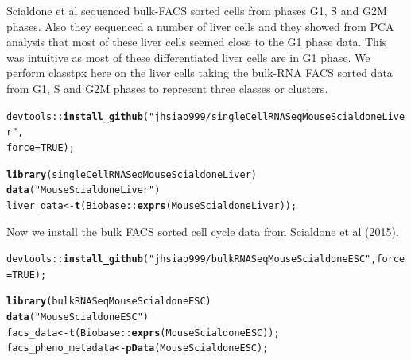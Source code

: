 \documentclass[12pt]{article}\usepackage[]{graphicx}\usepackage[usenames,dvipsnames]{color}
\makeatletter
\newcommand{\hlnum}[1]{\textcolor[rgb]{0.686,0.059,0.569}{#1}}%
\newcommand{\hlstr}[1]{\textcolor[rgb]{0.192,0.494,0.8}{#1}}%
\newcommand{\hlopt}[1]{\textcolor[rgb]{0,0,0}{#1}}%
\newcommand{\hlstd}[1]{\textcolor[rgb]{0.345,0.345,0.345}{#1}}%
\newcommand{\hlkwb}[1]{\textcolor[rgb]{0.69,0.353,0.396}{#1}}%
\newcommand{\hlkwc}[1]{\textcolor[rgb]{0.333,0.667,0.333}{#1}}%
\newcommand{\hlkwd}[1]{\textcolor[rgb]{0.737,0.353,0.396}{\textbf{#1}}}%
\newenvironment{kframe}{%
 \def\at@end@of@kframe{}%
 \ifinner\ifhmode%
  \def\at@end@of@kframe{\end{minipage}}%
  \begin{minipage}{\columnwidth}%
 \fi\fi%
 \def\FrameCommand##1{\hskip\@totalleftmargin \hskip-\fboxsep
 \colorbox{shadecolor}{##1}\hskip-\fboxsep
     \hskip-\linewidth \hskip-\@totalleftmargin \hskip\columnwidth}%
 \MakeFramed {\advance\hsize-\width
   \@totalleftmargin\z@ \linewidth\hsize
   \@setminipage}}%
 {\par\unskip\endMakeFramed%
 \at@end@of@kframe}
\newenvironment{knitrout}{}{} %
\makeatother
\begin{document}
Scialdone et al sequenced bulk-FACS sorted cells from phases G1, S and G2M phases. Also they sequenced a number of liver cells and they showed from PCA analysis that most of these liver cells seemed close to the G1 phase data. This was intuitive as most of these differentiated liver cells are in G1 phase. We perform classtpx here on the liver cells taking the bulk-RNA FACS sorted data from G1, S and G2M phases to represent three classes or clusters.

\begin{knitrout}
\color{fgcolor}\begin{kframe}
\begin{alltt}
\hlstd{devtools}\hlopt{::}\hlkwd{install_github}\hlstd{(}\hlstr{"jhsiao999/singleCellRNASeqMouseScialdoneLiver"}\hlstd{,}
                         \hlkwc{force}\hlstd{=}\hlnum{TRUE}\hlstd{);}
\end{alltt}
\end{kframe}
\end{knitrout}

\begin{knitrout}
\color{fgcolor}\begin{kframe}
\begin{alltt}
\hlkwd{library}\hlstd{(singleCellRNASeqMouseScialdoneLiver)}
\hlkwd{data}\hlstd{(}\hlstr{"MouseScialdoneLiver"}\hlstd{)}
\hlstd{liver_data} \hlkwb{<-} \hlkwd{t}\hlstd{(Biobase}\hlopt{::}\hlkwd{exprs}\hlstd{(MouseScialdoneLiver));}
\end{alltt}
\end{kframe}
\end{knitrout}

Now we install the bulk FACS sorted cell cycle data from Scialdone et al (2015).

\begin{knitrout}
\color{fgcolor}\begin{kframe}
\begin{alltt}
\hlstd{devtools}\hlopt{::}\hlkwd{install_github}\hlstd{(}\hlstr{"jhsiao999/bulkRNASeqMouseScialdoneESC"}\hlstd{,} \hlkwc{force}\hlstd{=}\hlnum{TRUE}\hlstd{);}
\end{alltt}
\end{kframe}
\end{knitrout}

\begin{knitrout}
\color{fgcolor}\begin{kframe}
\begin{alltt}
\hlkwd{library}\hlstd{(bulkRNASeqMouseScialdoneESC)}
\hlkwd{data}\hlstd{(}\hlstr{"MouseScialdoneESC"}\hlstd{)}
\hlstd{facs_data} \hlkwb{<-} \hlkwd{t}\hlstd{(Biobase}\hlopt{::}\hlkwd{exprs}\hlstd{(MouseScialdoneESC));}
\hlstd{facs_pheno_metadata} \hlkwb{<-} \hlkwd{pData}\hlstd{(MouseScialdoneESC);}
\end{alltt}
\end{kframe}
\end{knitrout}
\end{document}

